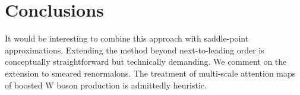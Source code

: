 \section{Conclusions}\label{sec:conclusions}

It would be interesting to combine this approach with saddle-point
approximations. Extending the method beyond next-to-leading order is
conceptually straightforward but technically demanding. We comment on
the extension to smeared renormalons. The treatment of multi-scale
attention maps of boosted W boson production is admittedly heuristic.

